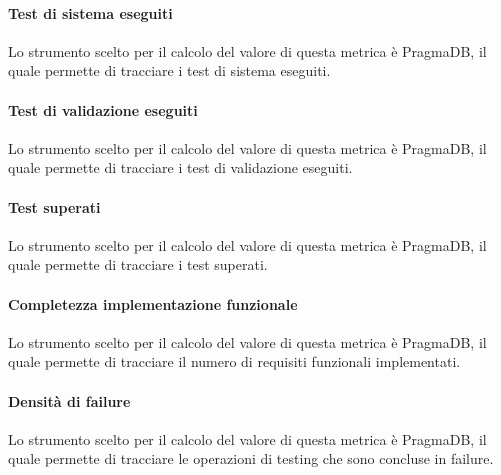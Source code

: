 \paragraph{Test di sistema eseguiti}
Lo strumento scelto per il calcolo del valore di questa metrica è PragmaDB, il quale permette di tracciare i test di sistema eseguiti.
\paragraph{Test di validazione eseguiti}
Lo strumento scelto per il calcolo del valore di questa metrica è PragmaDB, il quale permette di tracciare i test di validazione eseguiti.
\paragraph{Test superati}
Lo strumento scelto per il calcolo del valore di questa metrica è PragmaDB, il quale permette di tracciare i test superati.
\paragraph{Completezza implementazione funzionale}
Lo strumento scelto per il calcolo del valore di questa metrica è PragmaDB, il quale permette di tracciare il numero di requisiti funzionali implementati.
\paragraph{Densità di failure}
Lo strumento scelto per il calcolo del valore di questa metrica è PragmaDB, il quale permette di tracciare le operazioni di testing che sono concluse in failure.

